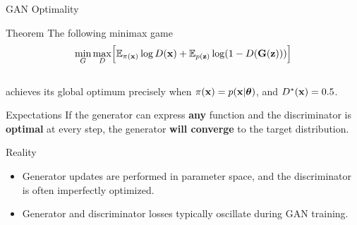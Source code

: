 \documentclass{beamer}
\begin{document}
\begin{frame}{GAN Optimality}
	\begin{block}{Theorem}
		The following minimax game 
		\vspace{-0.3cm}
		\[
		\min_{G} \max_D \Bigl[ \mathbb{E}_{\pi(\mathbf{x})} \log D(\mathbf{x}) + \mathbb{E}_{p(\mathbf{z})} \log (1 - D(\mathbf{G}(\mathbf{z}))) \Bigr]
		\]
		\vspace{-0.5cm} \\
		achieves its global optimum precisely when $\pi(\mathbf{x}) = p(\mathbf{x} | \boldsymbol{\theta})$, and $D^*(\mathbf{x}) = 0.5$.
	\end{block}
	\vspace{-0.2cm}
	\begin{block}{Expectations}
		If the generator can express \textbf{any} function and the discriminator is \textbf{optimal} at every step, the generator \textbf{will converge} to the target distribution.
	\end{block}
	\begin{block}{Reality}
		\begin{itemize}
			\item Generator updates are performed in parameter space, and the discriminator is often imperfectly optimized.
			\item Generator and discriminator losses typically oscillate during GAN training.
		\end{itemize}
	\end{block}
\end{frame}
\end{document}
